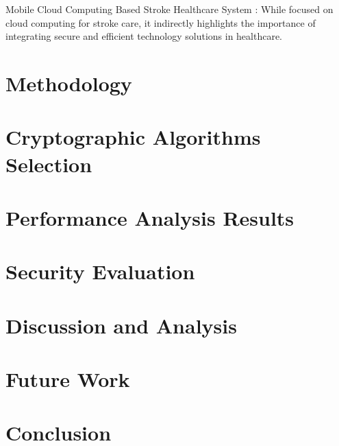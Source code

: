 \documentclass[cic,tc,english]{iiufrgs}
\begin{document}
    Mobile Cloud Computing Based Stroke Healthcare System \cite{Karaca2019}: While focused on cloud computing for stroke care, it indirectly highlights the importance of integrating secure and efficient technology solutions in healthcare.

\chapter{Methodology}


\chapter{Cryptographic Algorithms Selection}


\chapter{Performance Analysis Results}


\chapter{Security Evaluation}


\chapter{Discussion and Analysis}


\chapter{Future Work}


\chapter{Conclusion}




\end{document}
